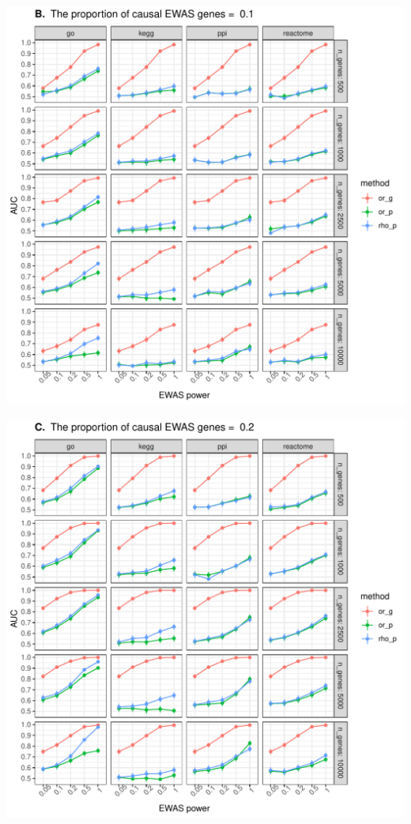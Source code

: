 \documentclass[11pt,twoside]{bristolthesis}
\begin{document}
\begin{center}\includegraphics[width=1\linewidth]{figure/06-ewas_gwas_comparison/method_test_gene_up_all/PEC_0.1} \end{center}
\begin{center}\includegraphics[width=1\linewidth]{figure/06-ewas_gwas_comparison/method_test_gene_up_all/PEC_0.2} \end{center}
\end{document}
